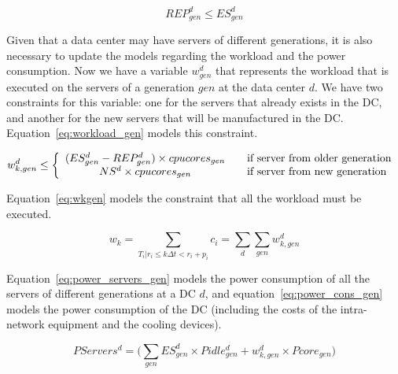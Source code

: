 \begin{equation} \label{eq:rep_only_existing_servers}
 REP_{gen}^d \leq ES_{gen}^d 
\end{equation}



Given that a data center may have servers of different generations, it is also necessary to update the models regarding the workload and the power consumption. Now we have a variable $w_{gen}^d$ that represents the workload that is executed on the servers of a generation $gen$ at the data center $d$. We have two constraints for this variable: one for the servers that already exists in the DC, and another for the new servers that will be manufactured in the DC. Equation~\eqref{eq:workload_gen} models this constraint.


\begin{equation} \label{eq:workload_gen}
w_{k,gen}^d \leq   \left\{ 
  \begin{array}{ c l }
    (ES_{gen}^d - REP_{gen}^d) \times cpucores_{gen}  & \quad \textrm{if server from older generation  }     \\
     NS^d \times cpucores_{gen}   & \quad \textrm{if server from new generation  }      \\
    
  \end{array}
\right.
\end{equation}

Equation~\eqref{eq:wkgen} models the constraint that all the workload must be executed.

\begin{equation} \label{eq:wkgen}
    w_k = \sum_{T_i|r_i\leq k\Delta t<r_i+p_i} c_i = \sum_d \sum_{gen} w_{k,gen}^d
\end{equation}







Equation~\eqref{eq:power_servers_gen} models the power consumption of all the servers of different generations at a DC $d$, and equation~\eqref{eq:power_cons_gen} models the power consumption of the DC (including the costs of the intra-network equipment and the cooling devices).


\begin{equation} \label{eq:power_servers_gen}
   PServers^d  =  \big(   \sum_{gen} ES_{gen}^d \times  Pidle_{gen}^d + w^d_{k,gen}  \times  Pcore_{gen} \big)
\end{equation}


